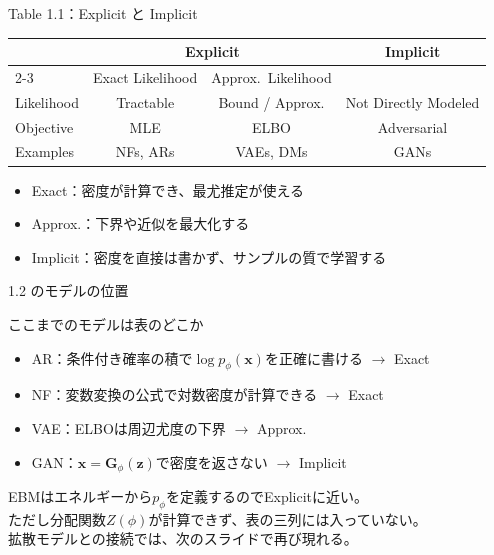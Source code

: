 \begin{frame}{Table 1.1：Explicit と Implicit}
    \begin{center}
    \footnotesize
    \renewcommand{\arraystretch}{1.45}
    \begin{tabular}{lccc}
        \hline
        & \multicolumn{2}{c}{Explicit} & Implicit \\
        \cline{2-3}
        & Exact Likelihood & Approx.\ Likelihood & \\
        \hline
        Likelihood & Tractable & Bound / Approx. & Not Directly Modeled \\
        Objective & MLE & ELBO & Adversarial \\
        Examples & NFs, ARs & VAEs, DMs & GANs \\
        \hline
    \end{tabular}
    \end{center}
    \vspace{0.6em}
    \begin{itemize}
        \item Exact：密度が計算でき、最尤推定が使える
        \item Approx.：下界や近似を最大化する
        \item Implicit：密度を直接は書かず、サンプルの質で学習する
    \end{itemize}
\end{frame}
\begin{frame}{1.2 のモデルの位置}
    \begin{exampleblock}{ここまでのモデルは表のどこか}
        \begin{itemize}
            \item AR：条件付き確率の積で\(\log p_{\phi}(\boldsymbol{x})\)を正確に書ける \(\rightarrow\) Exact
            \item NF：変数変換の公式で対数密度が計算できる \(\rightarrow\) Exact
            \item VAE：ELBOは周辺尤度の下界 \(\rightarrow\) Approx.
            \item GAN：\(\boldsymbol{x}=\boldsymbol{G}_{\phi}(\boldsymbol{z})\)で密度を返さない \(\rightarrow\) Implicit
        \end{itemize}
    \end{exampleblock}
    \vspace{0.4em}
    EBMはエネルギーから\(p_{\phi}\)を定義するのでExplicitに近い。\\
    ただし分配関数\(Z(\phi)\)が計算できず、表の三列には入っていない。\\
    拡散モデルとの接続では、次のスライドで再び現れる。
\end{frame}
